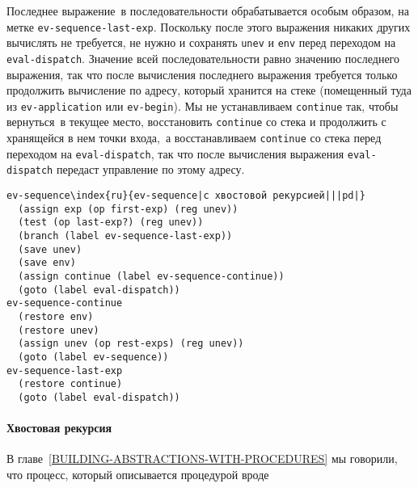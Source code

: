 Последнее выражение~в последовательности обрабатывается
особым образом, на метке {\tt ev-sequence-last-exp}.  Поскольку
после этого выражения никаких других вычислять не требуется, не нужно
и сохранять {\tt unev} и {\tt env} перед переходом на
{\tt eval-dispatch}.  Значение всей последовательности равно
значению последнего выражения, так что после вычисления последнего
выражения требуется только продолжить вычисление по адресу, который
хранится на стеке (помещенный туда из {\tt ev-application} или
{\tt ev-begin}).  Мы не устанавливаем
{\tt continue} так, чтобы вернуться~в текущее место,
восстановить {\tt continue} со стека и продолжить с хранящейся в
нем точки входа,~а восстанавливаем {\tt continue} со стека
перед переходом на {\tt eval-dispatch}, так что после
вычисления выражения {\tt eval-dispatch} передаст управление по
этому адресу.

\begin{Verbatim}[fontsize=\small]
ev-sequence\index{ru}{ev-sequence|с хвостовой рекурсией|||pd|}
  (assign exp (op first-exp) (reg unev))
  (test (op last-exp?) (reg unev))
  (branch (label ev-sequence-last-exp))
  (save unev)
  (save env)
  (assign continue (label ev-sequence-continue))
  (goto (label eval-dispatch))
ev-sequence-continue
  (restore env)
  (restore unev)
  (assign unev (op rest-exps) (reg unev))
  (goto (label ev-sequence))
ev-sequence-last-exp
  (restore continue)
  (goto (label eval-dispatch))
\end{Verbatim}

\paragraph{Хвостовая рекурсия}


В главе~\ref{BUILDING-ABSTRACTIONS-WITH-PROCEDURES} 
мы говорили,
что процесс, который описывается процедурой вроде

